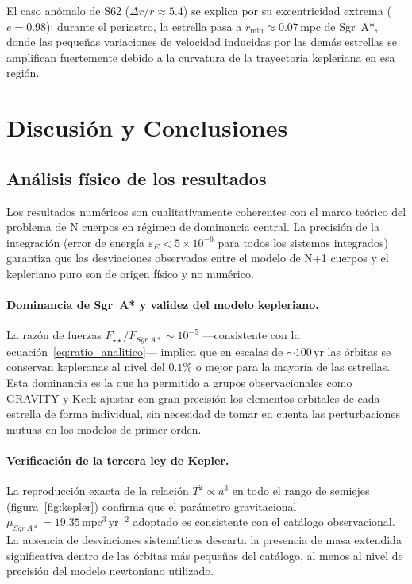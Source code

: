 \documentclass[12pt,a4paper]{article}
\newcommand{\SgrA}{Sgr~A*}
\newcommand{\mpc}{\text{mpc}}
\newcommand{\yr}{\text{yr}}
\begin{document}
El caso anómalo de S62 ($\Delta r/r \approx 5.4$) se explica por su
excentricidad extrema ($e = 0.98$): durante el periastro, la estrella pasa a
$r_{\min} \approx 0.07\,\mpc$ de \SgrA{}, donde las pequeñas variaciones de
velocidad inducidas por las demás estrellas se amplifican fuertemente debido a la
curvatura de la trayectoria kepleriana en esa región.

\section{Discusión y Conclusiones}
\label{sec:discusion}

\subsection{Análisis físico de los resultados}
\label{subsec:analisis}

Los resultados numéricos son cualitativamente coherentes con el marco teórico
del problema de N cuerpos en régimen de dominancia central.  La precisión de la
integración (error de energía $\varepsilon_E < 5 \times 10^{-6}$ para todos los
sistemas integrados) garantiza que las desviaciones observadas entre el modelo de
N+1 cuerpos y el kepleriano puro son de origen físico y no numérico.

\paragraph{Dominancia de \SgrA{} y validez del modelo kepleriano.}
La razón de fuerzas $F_{\star\star}/F_{\SgrA} \sim 10^{-5}$ —consistente con la
ecuación~\eqref{eq:ratio_analitico}— implica que en escalas de $\sim 100\,\yr$ las
órbitas se conservan kepleranas al nivel del $0.1\%$ o mejor para la mayoría de las
estrellas.  Esta dominancia es la que ha permitido a grupos observacionales como
GRAVITY y Keck ajustar con gran precisión los elementos orbitales de cada estrella
de forma individual, sin necesidad de tomar en cuenta las perturbaciones mutuas en
los modelos de primer orden.

\paragraph{Verificación de la tercera ley de Kepler.}
La reproducción exacta de la relación $T^2 \propto a^3$ en todo el rango de semiejes
(figura~\ref{fig:kepler}) confirma que el parámetro gravitacional
$\mu_{\SgrA} = 19.35\,\mpc^3\,\yr^{-2}$ adoptado es consistente con el catálogo
observacional.  La ausencia de desviaciones sistemáticas descarta la presencia de
masa extendida significativa dentro de las órbitas más pequeñas del catálogo, al
menos al nivel de precisión del modelo newtoniano utilizado.
\end{document}
